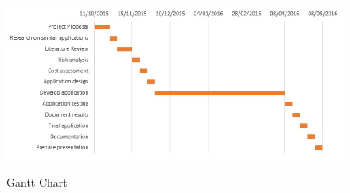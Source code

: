 \documentclass[12pt,ITBthesis]{report}
\begin{document}
	\begin{figure}[!h]
		\centering
		\includegraphics[width=1\textwidth]{ganttChart}
		\label{ft_fig_firstfig}
		\caption{Gantt Chart} 
	\end{figure}
\end{document}

